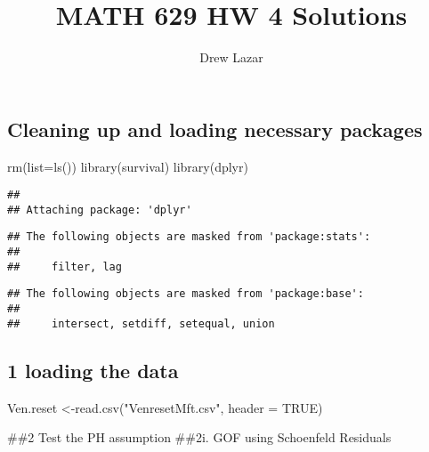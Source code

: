 \documentclass[
]{article}
\title{MATH 629 HW 4 Solutions}
\author{Drew Lazar}
\date{}
\newenvironment{Shaded}{\begin{snugshade}}{\end{snugshade}}
\newcommand{\AttributeTok}[1]{\textcolor[rgb]{0.77,0.63,0.00}{#1}}
\newcommand{\ConstantTok}[1]{\textcolor[rgb]{0.00,0.00,0.00}{#1}}
\newcommand{\FunctionTok}[1]{\textcolor[rgb]{0.00,0.00,0.00}{#1}}
\newcommand{\NormalTok}[1]{#1}
\newcommand{\OtherTok}[1]{\textcolor[rgb]{0.56,0.35,0.01}{#1}}
\newcommand{\SpecialCharTok}[1]{\textcolor[rgb]{0.00,0.00,0.00}{#1}}
\newcommand{\StringTok}[1]{\textcolor[rgb]{0.31,0.60,0.02}{#1}}
\begin{document}
\maketitle

\hypertarget{cleaning-up-and-loading-necessary-packages}{%
\subsection{Cleaning up and loading necessary
packages}\label{cleaning-up-and-loading-necessary-packages}}

\begin{Shaded}
\begin{Highlighting}[]
\FunctionTok{rm}\NormalTok{(}\AttributeTok{list=}\FunctionTok{ls}\NormalTok{())}
\FunctionTok{library}\NormalTok{(survival)}
\FunctionTok{library}\NormalTok{(dplyr)}
\end{Highlighting}
\end{Shaded}

\begin{verbatim}
## 
## Attaching package: 'dplyr'
\end{verbatim}

\begin{verbatim}
## The following objects are masked from 'package:stats':
## 
##     filter, lag
\end{verbatim}

\begin{verbatim}
## The following objects are masked from 'package:base':
## 
##     intersect, setdiff, setequal, union
\end{verbatim}

\hypertarget{loading-the-data}{%
\subsection{1 loading the data}\label{loading-the-data}}

\begin{Shaded}
\begin{Highlighting}[]
\NormalTok{Ven.reset }\OtherTok{\textless{}{-}}\FunctionTok{read.csv}\NormalTok{(}\StringTok{"VenresetMft.csv"}\NormalTok{, }\AttributeTok{header =} \ConstantTok{TRUE}\NormalTok{)}
\end{Highlighting}
\end{Shaded}

\#\#2 Test the PH assumption \#\#2i. GOF using Schoenfeld Residuals

\begin{Shaded}
\end{Shaded}
\end{document}
